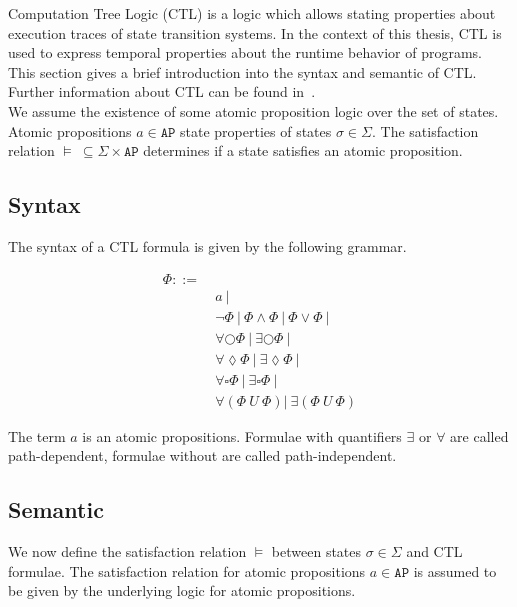\documentclass[11pt,a4paper,titlepage]{article}
\theoremstyle{definition}
\begin{document}
Computation Tree Logic (CTL) is a logic which allows stating properties about execution traces of state transition systems. 
In the context of this thesis, CTL is used to express temporal properties about the runtime behavior of programs. 
This section gives a brief introduction into the syntax and semantic of CTL.  
Further information about CTL can be found in~\cite{baier2008principles}.\\

We assume the existence of some atomic proposition logic over the set of states. 
Atomic propositions $a \in \mathtt{AP}$ state properties of states $\sigma \in \Sigma$. 
The satisfaction relation $\models \ \subseteq \Sigma \times \mathtt{AP}$ determines 
if a state satisfies an atomic proposition.


\subsection{Syntax}
The syntax of a CTL formula is given by the following grammar.

\begin{align*}
    \Phi  ::= \ & \\ 
    & a \ | \\
    & \neg \Phi \ | \ \Phi \land \Phi \ | \ \Phi \lor \Phi \ | \\
    & \forall\bigcirc\Phi \ | \ \exists\bigcirc\Phi \ | \\
    & \forall\lozenge\Phi \ | \ \exists\lozenge\Phi \ | \\
    & \forall\square\Phi \ | \ \exists\square\Phi \ | \\
    & \forall(\Phi \ U \ \Phi) | \ \exists(\Phi \ U \ \Phi) 
\end{align*}

The term $a$ is an atomic propositions. Formulae with quantifiers $\exists$ or $\forall$ are called
path-dependent, formulae without are called path-independent.

\subsection{Semantic}

We now define the satisfaction relation $\models$ between states $\sigma \in \Sigma$ and CTL formulae.
The satisfaction relation for atomic propositions $a \in \mathtt{AP}$ is assumed to be given by the underlying 
logic for atomic propositions.
\end{document}
